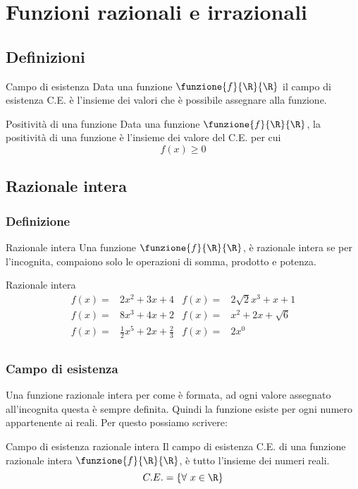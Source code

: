 \chapter{Funzioni razionali e irrazionali}
\section{Definizioni}
\begin{definizionet}{Campo di esistenza}{}
Data una funzione $\funzione{f}{\R}{\R}$ il campo di esistenza C.E. è 
l'insieme dei valori che è possibile assegnare alla 
funzione.
\end{definizionet}
\begin{definizionet}{Positività di una funzione}{}
	Data una funzione $\funzione{f}{\R}{\R}$, la 
	positività di una funzione è l'insieme dei 
	valore del C.E. per cui\[f(x)\geq 0 \]
\end{definizionet}
\section{Razionale intera}
\subsection{Definizione}
\begin{definizionet}{Razionale intera}{}
Una funzione $\funzione{f}{\R}{\R}$,  è  razionale intera se per l'incognita,  compaiono solo le operazioni di somma, prodotto e potenza.
\end{definizionet}
\begin{esempiot}{Razionale intera}{}
	\begin{align*}
	f(x)=&2x^2+3x+4&f(x)=&2\sqrt{2}x^3+x+1\\
		f(x)=&8x^3+4x+2&f(x)=&x^2+2x+\sqrt{6}\\
		f(x)=&\frac{1}{2}x^5+2x+\frac{2}{3}&f(x)=&2x^0\\
	\end{align*}
\end{esempiot}
\subsection{Campo di esistenza}
Una funzione razionale intera per come è formata, ad  ogni valore assegnato all'incognita questa è sempre  definita. Quindi la funzione esiste per ogni numero appartenente ai reali. Per questo possiamo scrivere:
\begin{definizionet}{Campo di esistenza razionale intera}{}
Il campo di esistenza C.E. di una funzione razionale intera 
$\funzione{f}{\R}{\R}$, è tutto l'insieme dei numeri reali.
\[C.E.=\lbrace\forall\ x\in\R\rbrace\]
\end{definizionet} 

